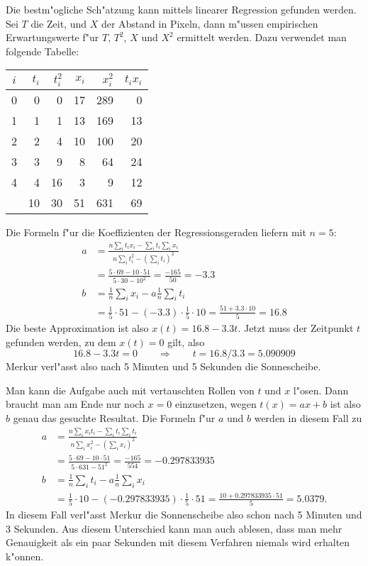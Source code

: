 \begin{loesung}
Die bestm"ogliche Sch"atzung kann mittels linearer Regression
gefunden werden. Sei $T$ die Zeit, und $X$ der Abstand in Pixeln,
dann m"ussen empirischen Erwartungswerte f"ur $T$, $T^2$, $X$ und $X^2$
ermittelt werden. Dazu verwendet man folgende Tabelle:
\begin{center}
\begin{tabular}{|c|rr|rr|r|}
\hline
$i$&$t_i$&$t_i^2$&$x_i$&$x_i^2$&$t_ix_i$\\
\hline
0& 0& 0&17&289& 0\\
1& 1& 1&13&169&13\\
2& 2& 4&10&100&20\\
3& 3& 9& 8& 64&24\\
4& 4&16& 3&  9&12\\
\hline
 &10&30&51&631&69\\
\hline
\end{tabular}
\end{center}
Die Formeln f"ur die Koeffizienten der Regressionsgeraden liefern
mit $n=5$:
\begin{align*}
a&=
\frac{n\sum_i t_ix_i -\sum_it_i\sum_ix_i}{n\sum_it_i^2-(\sum_i t_i)^2}
\\
&=\frac{5\cdot 69 - 10\cdot 51}{5\cdot 30 - 10^2}=\frac{-165}{50}=-3.3
\\
b&=\frac1n\sum_ix_i-a\frac1n\sum_it_i\\
&=\frac15\cdot 51-(-3.3)\cdot \frac15\cdot 10=\frac{51+3.3 \cdot 10}5= 16.8
\end{align*}
Die beste Approximation ist also $x(t)=16.8-3.3t$.
Jetzt muss der Zeitpunkt $t$ gefunden werden, zu dem $x(t)=0$ gilt,
also
\[
16.8-3.3t=0\qquad\Rightarrow\qquad t=16.8/3.3=5.090909
\]
Merkur verl"asst also nach 5 Minuten und 5 Sekunden die Sonnescheibe.

Man kann die Aufgabe auch mit vertauschten Rollen von $t$ und $x$
l"osen. Dann braucht man am Ende nur noch $x=0$ einzusetzen, wegen
$t(x)=ax+b$ ist also $b$ genau das gesuchte Resultat. Die Formeln
f"ur $a$ und $b$ werden in diesem Fall zu
\begin{align*}
a&=
\frac{n\sum_i x_it_i -\sum_it_i\sum_it_i}{n\sum_ix_i^2-(\sum_i x_i)^2}
\\
&=\frac{5\cdot 69 - 10\cdot 51}{5\cdot 631 - 51^2}=\frac{-165}{554}=-0.297833935
\\
b&=\frac1n\sum_it_i-a\frac1n\sum_ix_i\\
&=\frac15\cdot 10-(-0.297833935)\cdot\frac15\cdot 51=\frac{10+ 0.297833935\cdot 51}5= 5.0379.
\end{align*}
In diesem Fall verl"asst Merkur die Sonnenscheibe also schon nach 5 Minuten
und 3 Sekunden. Aus diesem Unterschied kann man auch ablesen, dass man
mehr Genauigkeit als ein paar Sekunden mit diesem Verfahren niemals
wird erhalten k"onnen.
\end{loesung}


